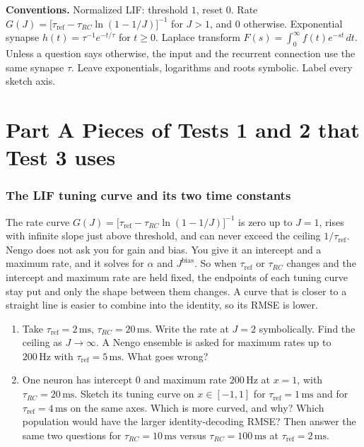 \documentclass[11pt,letterpaper]{article}
\newcommand{\Jb}{J^{\mathrm{bias}}}
\newcommand{\tref}{\tau_{\mathrm{ref}}}
\newcommand{\trc}{\tau_{RC}}
\begin{document}
\textbf{Conventions.} Normalized LIF: threshold $1$, reset $0$. Rate $G(J) = \bigl[\tref - \trc\ln(1 - 1/J)\bigr]^{-1}$ for $J > 1$, and $0$ otherwise. Exponential synapse $h(t) = \tau^{-1}e^{-t/\tau}$ for $t \ge 0$. Laplace transform $F(s) = \int_0^\infty f(t)e^{-st}\,dt$. Unless a question says otherwise, the input and the recurrent connection use the same synapse $\tau$. Leave exponentials, logarithms and roots symbolic. Label every sketch axis.

\part*{Part A \quad Pieces of Tests 1 and 2 that Test 3 uses}

\section{The LIF tuning curve and its two time constants}

\begin{idea}
The rate curve $G(J) = \bigl[\tref - \trc\ln(1 - 1/J)\bigr]^{-1}$ is zero up to $J = 1$, rises with infinite slope just above threshold, and can never exceed the ceiling $1/\tref$. Nengo does not ask you for gain and bias. You give it an intercept and a maximum rate, and it solves for $\alpha$ and $\Jb$. So when $\tref$ or $\trc$ changes and the intercept and maximum rate are held fixed, the endpoints of each tuning curve stay put and only the shape between them changes. A curve that is closer to a straight line is easier to combine into the identity, so its RMSE is lower.
\end{idea}

\begin{enumerate}
\item Take $\tref = 2\,\mathrm{ms}$, $\trc = 20\,\mathrm{ms}$. Write the rate at $J = 2$ symbolically. Find the ceiling as $J \to \infty$. A Nengo ensemble is asked for maximum rates up to $200\,\mathrm{Hz}$ with $\tref = 5\,\mathrm{ms}$. What goes wrong?
\item One neuron has intercept $0$ and maximum rate $200\,\mathrm{Hz}$ at $x = 1$, with $\trc = 20\,\mathrm{ms}$. Sketch its tuning curve on $x \in [-1, 1]$ for $\tref = 1\,\mathrm{ms}$ and for $\tref = 4\,\mathrm{ms}$ on the same axes. Which is more curved, and why? Which population would have the larger identity-decoding RMSE? Then answer the same two questions for $\trc = 10\,\mathrm{ms}$ versus $\trc = 100\,\mathrm{ms}$ at $\tref = 2\,\mathrm{ms}$.
\end{enumerate}
\end{document}
